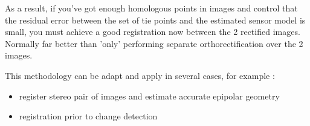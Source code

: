 As a result, if you've got enough homologous points in images and control that
the residual error between the set of tie points and the estimated sensor model
is small, you must achieve a good registration now between the 2 rectified
images. Normally far better than 'only' performing separate orthorectification
over the 2 images.

This methodology can be adapt and apply in several cases, for example :
\begin{itemize}

\item register stereo pair of images and estimate accurate epipolar geometry
\item registration prior to change detection

\end{itemize}

